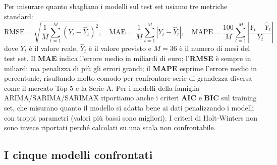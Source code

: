 Per misurare quanto sbagliano i modelli sul test set usiamo tre metriche standard:
\begin{equation}
    \mathrm{RMSE} = \sqrt{\frac{1}{M} \sum_{t=1}^{M} (Y_t - \hat{Y}_t)^2}, \quad
    \mathrm{MAE} = \frac{1}{M} \sum_{t=1}^{M} |Y_t - \hat{Y}_t|, \quad
    \mathrm{MAPE} = \frac{100}{M} \sum_{t=1}^{M} \left|\frac{Y_t - \hat{Y}_t}{Y_t}\right|
    \label{eq:metriche_errore}
\end{equation}
dove $Y_t$ è il valore reale, $\hat{Y}_t$ è il valore previsto e $M = 36$ è il numero di mesi del test set. Il \textbf{MAE} indica l'errore medio in miliardi di euro; l'\textbf{RMSE} è sempre in miliardi ma penalizza di più gli errori grandi; il \textbf{MAPE} esprime l'errore medio in percentuale, risultando molto comodo per confrontare serie di grandezza diversa come il mercato Top-5 e la Serie A. Per i modelli della famiglia ARIMA/SARIMA/SARIMAX riportiamo anche i criteri \textbf{AIC} e \textbf{BIC} sul training set, che misurano quanto il modello si adatta bene ai dati penalizzando i modelli con troppi parametri (valori più bassi sono migliori). I criteri di Holt-Winters non sono invece riportati perché calcolati su una scala non confrontabile.

\subsection{I cinque modelli confrontati}

